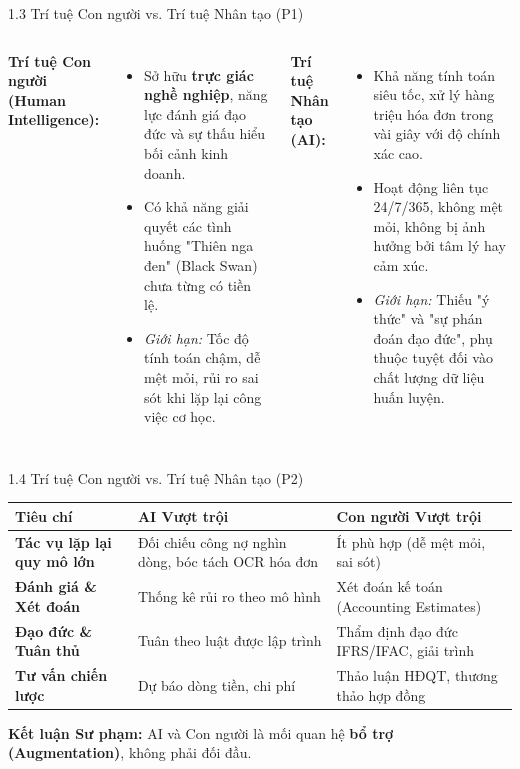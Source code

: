 \documentclass[aspectratio=169]{beamer}
\begin{document}
\begin{frame}{1.3 Trí tuệ Con người vs. Trí tuệ Nhân tạo (P1)}
    \begin{columns}
        \textbf{Trí tuệ Con người (Human Intelligence):}
        \begin{itemize}
            \item Sở hữu \textbf{trực giác nghề nghiệp}, năng lực đánh giá đạo đức và sự thấu hiểu bối cảnh kinh doanh.
            \item Có khả năng giải quyết các tình huống "Thiên nga đen" (Black Swan) chưa từng có tiền lệ.
            \item \emph{Giới hạn:} Tốc độ tính toán chậm, dễ mệt mỏi, rủi ro sai sót khi lặp lại công việc cơ học.
        \end{itemize}
        
        \textbf{Trí tuệ Nhân tạo (AI):}
        \begin{itemize}
            \item Khả năng tính toán siêu tốc, xử lý hàng triệu hóa đơn trong vài giây với độ chính xác cao.
            \item Hoạt động liên tục 24/7/365, không mệt mỏi, không bị ảnh hưởng bởi tâm lý hay cảm xúc.
            \item \emph{Giới hạn:} Thiếu "ý thức" và "sự phán đoán đạo đức", phụ thuộc tuyệt đối vào chất lượng dữ liệu huấn luyện.
        \end{itemize}
    \end{columns}
\end{frame}

\begin{frame}{1.4 Trí tuệ Con người vs. Trí tuệ Nhân tạo (P2)}
    \begin{table}
        \centering
        \small
        \begin{tabular}{p{4.2cm}p{4.8cm}p{4.8cm}}
            \toprule
            \textbf{Tiêu chí} & \textbf{AI Vượt trội} & \textbf{Con người Vượt trội} \\
            \midrule
            \textbf{Tác vụ lặp lại quy mô lớn} & Đối chiếu công nợ nghìn dòng, bóc tách OCR hóa đơn & Ít phù hợp (dễ mệt mỏi, sai sót) \\
            \textbf{Đánh giá \& Xét đoán} & Thống kê rủi ro theo mô hình & Xét đoán kế toán (Accounting Estimates) \\
            \textbf{Đạo đức \& Tuân thủ} & Tuân theo luật được lập trình & Thẩm định đạo đức IFRS/IFAC, giải trình \\
            \textbf{Tư vấn chiến lược} & Dự báo dòng tiền, chi phí & Thảo luận HĐQT, thương thảo hợp đồng \\
            \bottomrule
        \end{tabular}
    \end{table}
    \vspace{0.2cm}
    \textbf{Kết luận Sư phạm:} AI và Con người là mối quan hệ \textbf{bổ trợ (Augmentation)}, không phải đối đầu.
\end{frame}
\end{document}

